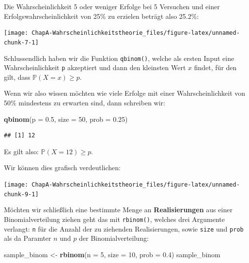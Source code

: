 \documentclass[]{book}
\newenvironment{Shaded}{\begin{snugshade}}{\end{snugshade}}
\newcommand{\KeywordTok}[1]{\textcolor[rgb]{0.13,0.29,0.53}{\textbf{#1}}}
\newcommand{\DataTypeTok}[1]{\textcolor[rgb]{0.13,0.29,0.53}{#1}}
\newcommand{\DecValTok}[1]{\textcolor[rgb]{0.00,0.00,0.81}{#1}}
\newcommand{\FloatTok}[1]{\textcolor[rgb]{0.00,0.00,0.81}{#1}}
\newcommand{\StringTok}[1]{\textcolor[rgb]{0.31,0.60,0.02}{#1}}
\newcommand{\NormalTok}[1]{#1}
\begin{document}
Die Wahrscheinlichkeit 5 oder weniger Erfolge bei 5 Versuchen und einer
Erfolgswahrscheinlichkeit von 25\% zu erzielen beträgt also 25.2\%:

\begin{center}\texttt{[image: ChapA-Wahrscheinlichkeitstheorie\_files/figure-latex/unnamed-chunk-7-1]} \end{center}

Schlussendlich haben wir die Funktion \texttt{qbinom()}, welche als
ersten Input eine Wahrscheinlichkeit \texttt{p} akzeptiert und dann den
kleinsten Wert \(x\) findet, für den gilt, dass
\(\mathbb{P}(X=x)\geq p\).

Wenn wir also wissen möchten wie viele Erfolge mit einer
Wahrscheinlichkeit von 50\% mindestens zu erwarten sind, dann schreiben
wir:

\begin{Shaded}
\begin{Highlighting}[]
\KeywordTok{qbinom}\NormalTok{(}\DataTypeTok{p =} \FloatTok{0.5}\NormalTok{, }\DataTypeTok{size =} \DecValTok{50}\NormalTok{, }\DataTypeTok{prob =} \FloatTok{0.25}\NormalTok{)}
\end{Highlighting}
\end{Shaded}

\begin{verbatim}
## [1] 12
\end{verbatim}

Es gilt also: \(\mathbb{P}(X=12)\geq p\).

Wir können dies grafisch verdeutlichen:

\begin{center}\texttt{[image: ChapA-Wahrscheinlichkeitstheorie\_files/figure-latex/unnamed-chunk-9-1]} \end{center}

Möchten wir schließlich eine bestimmte Menge an \textbf{Realisierungen}
aus einer Binomialverteilung ziehen geht das mit \texttt{rbinom()},
welches drei Argumente verlangt: \texttt{n} für die Anzahl der zu
ziehenden Realisierungen, sowie \texttt{size} und \texttt{prob} als da
Paramter \(n\) und \(p\) der Binomialverteilung:

\begin{Shaded}
\begin{Highlighting}[]
\NormalTok{sample_binom <-}\StringTok{ }\KeywordTok{rbinom}\NormalTok{(}\DataTypeTok{n =} \DecValTok{5}\NormalTok{, }\DataTypeTok{size =} \DecValTok{10}\NormalTok{, }\DataTypeTok{prob =} \FloatTok{0.4}\NormalTok{)}
\NormalTok{sample_binom}
\end{Highlighting}
\end{Shaded}
\end{document}
